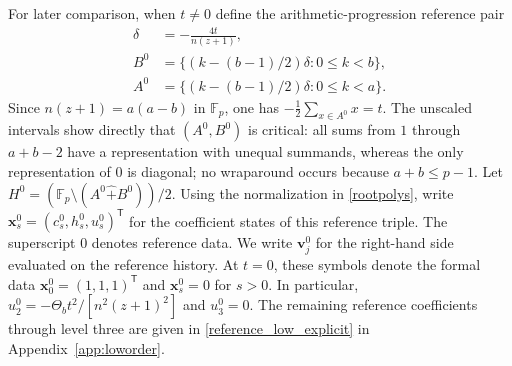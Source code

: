 \documentclass[12pt]{article}
\theoremstyle{remark}
\newcommand{\F}{\mathbb{F}_p}
\newcommand{\rs}{\mathbin{\widehat+}}
\begin{document}
For later comparison, when $t\ne0$ define the arithmetic-progression
reference pair
\begin{equation}\label{referenceprogressions}
\begin{aligned}
 \delta&=-\frac{4t}{n(z+1)},\\
 B^0&=\{(k-(b-1)/2)\delta:0\le k<b\},\\
 A^0&=\{(k-(b-1)/2)\delta:0\le k<a\}.
\end{aligned}
\end{equation}
Since $n(z+1)=a(a-b)$ in $\F$, one has
$-\tfrac12\sum_{x\in A^0}x=t$.  The unscaled intervals show directly that
$(A^0,B^0)$ is critical: all sums from $1$ through $a+b-2$ have a
representation with unequal summands, whereas the only representation of $0$ is diagonal; no wraparound
occurs because $a+b\le p-1$.  Let
$H^0=(\F\setminus(A^0\rs B^0))/2$.  Using the normalization in
\eqref{rootpolys}, write
$\mathbf x_s^0=(c_s^0,h_s^0,u_s^0)^{\mathsf T}$ for the coefficient
states of this reference triple.  The superscript $0$ denotes reference
data.  We write $\mathbf v_j^0$ for the right-hand side evaluated on
the reference history.  At $t=0$, these symbols denote the formal data
$\mathbf x_0^0=(1,1,1)^{\mathsf T}$ and $\mathbf x_s^0=0$ for $s>0$.
In particular, $u_2^0=-\Theta_bt^2/[n^2(z+1)^2]$ and $u_3^0=0$.
The remaining reference coefficients through level three are given
in \eqref{reference_low_explicit} in Appendix~\ref{app:loworder}.
\end{document}
